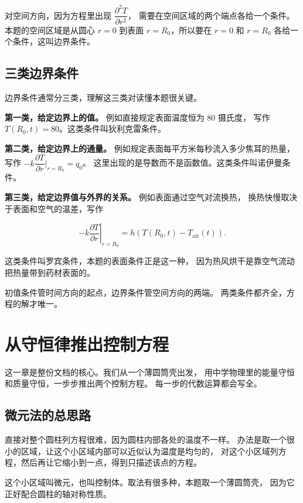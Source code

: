 对空间方向，因为方程里出现 $\dfrac{\partial^2 T}{\partial r^2}$，
需要在空间区域的两个端点各给一个条件。本题的空间区域是从圆心 $r=0$
到表面 $r=R_0$，所以要在 $r=0$ 和 $r=R_0$ 各给一个条件，这叫边界条件。

\subsection{三类边界条件}

边界条件通常分三类，理解这三类对读懂本题很关键。

\textbf{第一类，给定边界上的值。} 例如直接规定表面温度恒为 $80$ 摄氏度，
写作 $T(R_0,t)=80$。这类条件叫狄利克雷条件。

\textbf{第二类，给定边界上的通量。} 例如规定表面每平方米每秒流入多少焦耳的热量，
写作 $-k\dfrac{\partial T}{\partial r}\Big|_{r=R_0}=q_0$。
这里出现的是导数而不是函数值。这类条件叫诺伊曼条件。

\textbf{第三类，给定边界值与外界的关系。} 例如表面通过空气对流换热，
换热快慢取决于表面和空气的温差，写作

\begin{equation}
-k\left.\frac{\partial T}{\partial r}\right|_{r=R_0} = h\left(T(R_0,t)-T_{\mathrm{air}}(t)\right).
\end{equation}

这类条件叫罗宾条件，本题的表面条件正是这一种，
因为热风烘干是靠空气流动把热量带到药材表面的。

\keypoint
初值条件管时间方向的起点，边界条件管空间方向的两端。
两类条件都齐全，方程的解才唯一。

\section{从守恒律推出控制方程}

这一章是整份文档的核心。我们从一个薄圆筒壳出发，
用中学物理里的能量守恒和质量守恒，一步步推出两个控制方程。
每一步的代数运算都会写全。

\subsection{微元法的总思路}

直接对整个圆柱列方程很难，因为圆柱内部各处的温度不一样。
办法是取一个很小的区域，让这个小区域内部可以近似认为温度是均匀的，
对这个小区域列方程，然后再让它缩小到一点，得到只描述该点的方程。

这个小区域叫微元，也叫控制体。取法有很多种，本题取一个薄圆筒壳，
因为它正好配合圆柱的轴对称性质。

